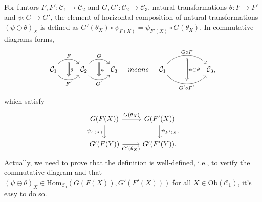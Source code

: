 \documentclass{article}
\begin{document}
\begin{defi}\label{horizontal composition}
	For funtors $F,F':\mathcal{C}_1\to\mathcal{C}_2$ and $G,G':\mathcal{C}_2\to\mathcal{C}_3$, natural transformations $\theta:F\to F'$ and $\psi:G\to G'$, the element of {\rm horizontal composition} of natural transformations $(\psi\ominus\theta)_X$ is defined as $G'(\theta_X)\circ\psi_{F(X)}=\psi_{F'(X)}\circ G(\theta_X)$. In commutative diagrams forms,
	\[\begin{tikzcd}
			\mathcal{C}_1 \arrow[bend left=50, r, "F", ""' name=F] \arrow[bend right=50, r, "F'"', "" name=F'] &
			\mathcal{C}_2 \arrow[bend left=50, r, "G", ""' name=G] \arrow[bend right=50, r, "G'"', "" name=G'] &
			\arrow[Rightarrow, from=F, to=F', "\theta"] \arrow[Rightarrow, from=G, to=G', "\psi"]\mathcal{C}_3
		\end{tikzcd}\quad{means}\quad\begin{tikzcd}
		\mathcal{C}_1
			\arrow[bend left=50, rr, "G\circ F", ""' name=A]
			\arrow[bend right=50, rr, "G'\circ F'"', "" name=B] & & 
			\arrow[Rightarrow, from=A, to=B, "\psi\ominus\theta"]\mathcal{C}_3,
	\end{tikzcd}\]
	which satisfy
	\begin{equation}\begin{tikzcd}
		G(F(X)) \arrow[r,"G(\theta_X)"] \arrow[d,"\psi_{F(X)}"'] & G(F'(X)) \arrow[d,"\psi_{F'(X)}"] \\
		G'(F(Y)) \arrow[r,"G'(\theta_X)"'] & G'(F'(Y)).
	\end{tikzcd}\end{equation}
	Actually, we need to prove that the definition is well-defined, i.e., to verify the commutative diagram and that $(\psi\ominus\theta)_X\in\mathrm{Hom}_{\mathcal{C}_3}(G(F(X)),G'(F'(X)))$ for all $X\in\mathrm{Ob}(\mathcal{C}_1)$, it's easy to do so.
\end{defi}
\end{document}
